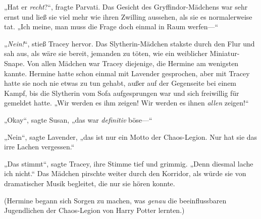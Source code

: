 „Hat er \emph{recht}?“, fragte Parvati. Das Gesicht des Gryffindor-Mädchens war sehr ernst und ließ sie viel mehr wie ihren Zwilling aussehen, als sie es normalerweise tat.
„Ich meine, man muss die Frage doch einmal in Raum werfen—“

„\emph{Nein!}“, stieß Tracey hervor. Das Slytherin-Mädchen stakste durch den Flur und sah aus, als wäre sie bereit, jemanden zu töten, wie ein weiblicher Miniatur-Snape. Von allen Mädchen war Tracey diejenige, die Hermine am wenigsten kannte. Hermine hatte schon einmal mit Lavender gesprochen, aber mit Tracey hatte sie noch nie etwas zu tun gehabt, außer auf der Gegenseite bei einem Kampf, bis die Slytherin vom Sofa aufgesprungen war und sich freiwillig für \SPHEW gemeldet hatte.
„Wir werden es ihm zeigen! Wir werden es ihnen \emph{allen} zeigen!“

„Okay“, sagte Susan, „das war \emph{definitiv} böse—“

„Nein“, sagte Lavender, „das ist nur ein Motto der Chaos-Legion. Nur hat sie das irre Lachen vergessen.“

„Das stimmt“, sagte Tracey, ihre Stimme tief und grimmig.
„Denn diesmal lache ich nicht.“ Das Mädchen pirschte weiter durch den Korridor, als würde sie von dramatischer Musik begleitet, die nur sie hören konnte.

(Hermine begann sich Sorgen zu machen, was \emph{genau} die beeinflussbaren Jugendlichen der Chaos-Legion von Harry Potter lernten.)

